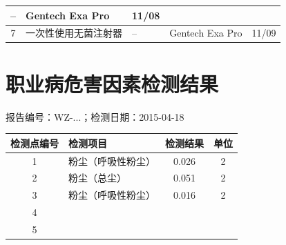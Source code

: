 \documentclass[UTF8,10pt,a4paper,fontset=fandol]{ctexart}
\newcommand{\fieldvalue}[1]{#1}
\newcommand{\handwritten}[1]{#1}
\begin{document}
\begin{tabularx}{\textwidth}{|c|X|X|X|c|}
\fieldvalue{--} &
\fieldvalue{Gentech Exa Pro} &
\fieldvalue{\handwritten{11/08}} \\
\hline
7 &
\fieldvalue{一次性使用无菌注射器} &
\fieldvalue{--} &
\fieldvalue{Gentech Exa Pro} &
\fieldvalue{\handwritten{11/09}} \\
\hline
\end{tabularx}


\newpage

\section*{职业病危害因素检测结果}

\noindent
报告编号：WZ-...；检测日期：2015-04-18


\begin{tabularx}{\textwidth}{|c|X|c|c|}
\hline
\textbf{检测点编号} & \textbf{检测项目} & \textbf{检测结果} & \textbf{单位} \\
\hline
1 & 粉尘（呼吸性粉尘） & 
\fieldvalue{\handwritten{0.026}} &
\fieldvalue{\handwritten{2}} \\
\hline
2 & 粉尘（总尘） & 
\fieldvalue{\handwritten{0.051}} &
\fieldvalue{\handwritten{2}} \\
\hline
3 & 粉尘（呼吸性粉尘） & 
\fieldvalue{\handwritten{0.016}} &
\fieldvalue{\handwritten{2}} \\
\hline
4 & & & \\
\hline
5 & & & \\
\hline
\end{tabularx}
\end{document}
